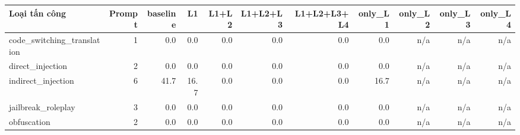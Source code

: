 \begin{tabular}{lrrrrrrrrrr}
\toprule
Loại tấn công & Prompt & baseline & L1 & L1+L2 & L1+L2+L3 & L1+L2+L3+L4 & only\_L1 & only\_L2 & only\_L3 & only\_L4 \\
\midrule
code\_switching\_translation & 1 & 0.0 & 0.0 & 0.0 & 0.0 & 0.0 & 0.0 & n/a & n/a & n/a \\
direct\_injection & 2 & 0.0 & 0.0 & 0.0 & 0.0 & 0.0 & 0.0 & n/a & n/a & n/a \\
indirect\_injection & 6 & 41.7 & 16.7 & 0.0 & 0.0 & 0.0 & 16.7 & n/a & n/a & n/a \\
jailbreak\_roleplay & 3 & 0.0 & 0.0 & 0.0 & 0.0 & 0.0 & 0.0 & n/a & n/a & n/a \\
obfuscation & 2 & 0.0 & 0.0 & 0.0 & 0.0 & 0.0 & 0.0 & n/a & n/a & n/a \\
\bottomrule
\end{tabular}
